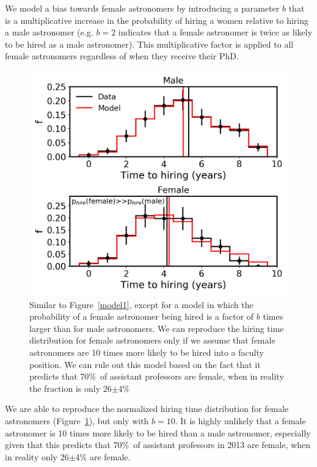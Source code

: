 \documentclass[modern]{aastex62}
\begin{document}
We model a bias towards female astronomers by introducing a parameter $b$ that is a multiplicative increase in the probability of hiring a women relative to hiring a male astronomer (e.g. $b=2$ indicates that a female astronomer is twice as likely to be hired as a male astronomer). This multiplicative factor is applied to all female astronomers regardless of when they receive their PhD. 

\begin{figure}[!hbt]
\center
\includegraphics[scale=.6]{model2_b10.png}
\caption{Similar to Figure~\ref{model1}, except for a model in which the probability of a female astronomer being hired is a factor of $b$ times larger than for male astronomers. We can reproduce the hiring time distribution for female astronomers only if we assume that female astronomers are 10 times more likely to be hired into a faculty position. We can rule out this model based on the fact that it predicts that 70\%\ of assistant professors are female, when in reality the fraction is only 26$\pm$4\% \citep{hug14} \label{model2_b10}}
\end{figure}

We are able to reproduce the normalized hiring time distribution for female astronomers (Figure~\ref{model2_b10}), but only with $b=10$. It is highly unlikely that a female astronomer is 10 times more likely to be hired than a male astronomer, especially given that this predicts that 70\%\ of assistant professors in 2013 are female, when in reality only 26$\pm$4\% are female. 
\end{document}
